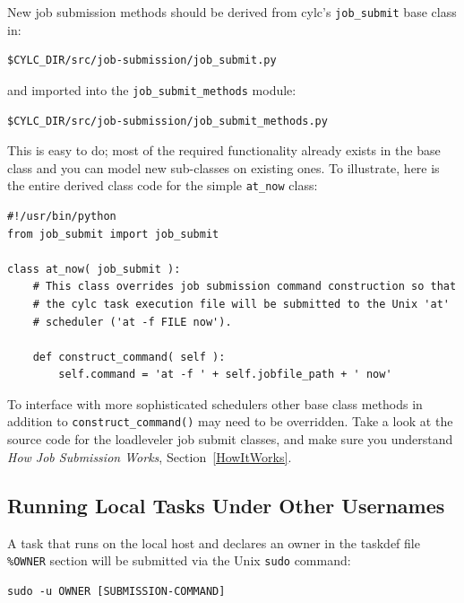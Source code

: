 \documentclass[11pt,a4paper]{article}
\begin{document}
New job submission methods should be derived from cylc's
\lstinline=job_submit= base class in:

\begin{lstlisting}
$CYLC_DIR/src/job-submission/job_submit.py
\end{lstlisting}

and imported into the \lstinline=job_submit_methods= module:

\begin{lstlisting}
$CYLC_DIR/src/job-submission/job_submit_methods.py
\end{lstlisting}

This is easy to do; most of the required functionality already exists in
the base class and you can model new sub-classes on existing ones. To
illustrate, here is the entire derived class code for the simple 
\lstinline=at_now= class:

\lstset{language=Python}

\begin{lstlisting}
#!/usr/bin/python
from job_submit import job_submit

class at_now( job_submit ):
    # This class overrides job submission command construction so that
    # the cylc task execution file will be submitted to the Unix 'at'
    # scheduler ('at -f FILE now').

    def construct_command( self ):
        self.command = 'at -f ' + self.jobfile_path + ' now'
\end{lstlisting}

To interface with more sophisticated schedulers other base class methods
in addition to \lstinline=construct_command()= may need to be overridden.
Take a look at the source code for the loadleveler job submit classes,
and make sure you understand {\em How Job Submission Works},
Section~\ref{HowItWorks}.

\subsection{Running Local Tasks Under Other Usernames}
\label{RunningLocalTasksUnderOtherUsernames}

\lstset{language=cylctaskdef}

A task that runs on the local host and declares an owner in the taskdef
file \lstinline=%OWNER= section will be submitted via the Unix
\lstinline=sudo= command:  

\lstset{language=bash}

\begin{lstlisting}
sudo -u OWNER [SUBMISSION-COMMAND]
\end{lstlisting}
\end{document}
